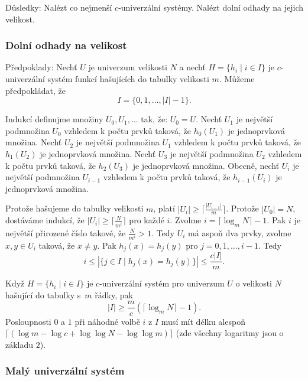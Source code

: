 \documentclass[a4paper,12pt]{article}
\begin{document}
Důsledky: Nalézt co nejmenší $c$-univerzální 
systémy. Nalézt dolní odhady na jejich velikost.

\subsubsection{Dolní odhady na velikost}

Předpoklady: Nechť $U$ je univerzum velikosti $N$ a nechť 
$H=\{h_i\mid i\in I\}$ je $c$-univerzální systém funkcí hašujících do tabulky velikosti 
$m$. Můžeme předpoklá\-dat, že 
$$I=\{0,1,\dots,|I|-1\}.$$

Indukcí definujme množiny $U_0,U_1,\dots$ tak, že: 
$U_0=U$.\newline 
Nechť $U_1$ je největší podmnožina $U_0$ vzhledem k počtu 
prvků taková, že $h_0(U_1)$ je jednoprvková 
množina. \newline 
Nechť $U_2$ je největší podmnožina $U_1$ vzhledem k počtu 
prvků taková, že $h_1(U_2)$ je jednoprvková 
množina. \newline 
Nechť $U_3$ je největší podmnožina $U_2$ vzhledem k počtu 
prvků taková, že $h_2(U_3)$ je jednoprvková 
množina. \newline 
Obecně, nechť $U_i$ je největší podmnožina $U_{
i-1}$ vzhledem k počtu 
prvků taková, že $h_{i-1}(U_i)$ je jednoprvková 
množina. 

Protože hašujeme do tabulky velikosti $m$, platí 
$|U_i|\ge\lceil\frac {|U_{i-1}|}m\rceil$. Protože $|U_0|=N$, dostáváme indukcí, že 
$|U_i|\ge\lceil\frac N{m^i}\rceil$ pro každé $i$. Zvolme $i=
\lceil\log_mN\rceil -1$. Pak $i$ je 
největší přirozené číslo takové, že $\frac 
N{m^i}>1$. Tedy $U_i$ má 
aspoň dva prvky, zvolme $x,y\in U_i$ taková, že $x\ne y$. Pak 
$h_j(x)=h_j(y)$ pro $j=0,1,\dots,i-1$. Tedy 
$$i\le |\{j\in I\mid h_j(x)=h_j(y)\}|\le\frac {c|I|}m.$$

\begin{veta}Když $H=\{h_i\mid i\in I\}$ je $c$-univerzální systém pro 
univerzum $U$ o velikosti $N$ hašující do tabulky s~$m$ řádky, pak 
$$|I|\ge\frac mc(\lceil\log_mN\rceil -1).$$
Posloupnosti $0$ a $1$ při náhodné volbě $i$ z $I$ musí mít 
délku alespoň $\lceil (\log m-\log c+\log\log N-\log\log m)\rceil$ (zde všechny logaritmy 
jsou o základu $2$).
\end{veta}

\subsubsection{Malý univerzální systém}
\end{document}

